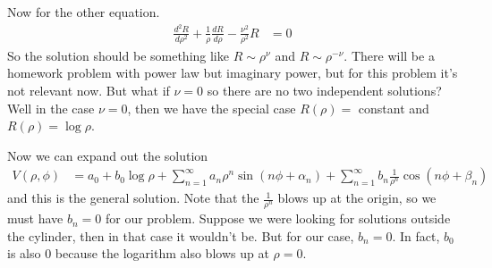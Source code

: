 Now for the other equation.
\begin{align}
    \frac{d^2 R}{d\rho^2}
    +
    \frac{1}{\rho}
    \frac{dR}{d\rho}
    -
    \frac{\nu^2}{\rho^2}R
    &=
    0
\end{align}
So the solution should be something like $R\sim \rho^\nu$
and $R\sim \rho^{-\nu}$.
There will be a homework problem with power law but imaginary power,
but for this problem it's not relevant now.
But what if $\nu=0$ so there are no two independent solutions?
Well in the case $\nu=0$,
then we have the special case
$R\left( \rho \right) =$ constant and $R\left( \rho \right) = \log \rho$.

Now we can expand out the solution
\begin{align}
    V\left( \rho, \phi \right)
    &=
    a_0 + b_0 \log\rho
    +
    \sum_{n=1}^{\infty}
    a_n \rho^n \sin\left( n\phi + \alpha_n \right)
    +
    \sum_{n=1}^{\infty} b_n \frac{1}{\rho^n}
    \cos\left( n \phi + \beta_n \right)
\end{align}
and this is the general solution.
Note that the $\frac{1}{\rho^n}$ blows up at the origin,
so we must have $b_n=0$ for our problem.
Suppose we were looking for solutions outside the cylinder,
then in that case it wouldn't be.
But for our case,
$b_n=0$.
In fact, $b_0$ is also $0$ because the logarithm also blows up at $\rho=0$.

